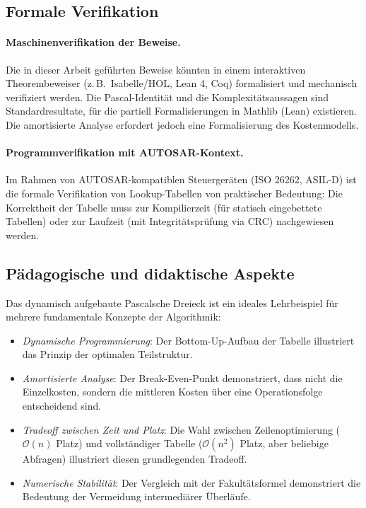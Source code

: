 ﻿\documentclass[12pt, a4paper]{article}
\newcommand{\Oh}{\mathcal{O}}
\theoremstyle{plain}
\theoremstyle{definition}
\theoremstyle{remark}
\renewcommand{\Oh}{\mathcal{O}}
\begin{document}
\subsection{Formale Verifikation}

\paragraph{Maschinenverifikation der Beweise.}
Die in dieser Arbeit geführten Beweise könnten in einem interaktiven
Theorembeweiser (z.\,B.\ Isabelle/HOL, Lean 4, Coq) formalisiert
und mechanisch verifiziert werden. Die Pascal-Identität und die
Komplexitätsaussagen sind Standardresultate, für die partiell
Formalisierungen in Mathlib (Lean) existieren. Die amortisierte
Analyse erfordert jedoch eine Formalisierung des Kostenmodells.

\paragraph{Programmverifikation mit AUTOSAR-Kontext.}
Im Rahmen von AUTOSAR-kompatiblen Steuergeräten \cite{epp2026autosar}
(ISO 26262, ASIL-D) ist die formale Verifikation von Lookup-Tabellen
von praktischer Bedeutung: Die Korrektheit der Tabelle muss zur
Kompilierzeit (für statisch eingebettete Tabellen) oder zur Laufzeit
(mit Integritätsprüfung via CRC) nachgewiesen werden.

\subsection{Pädagogische und didaktische Aspekte}

Das dynamisch aufgebaute Pascalsche Dreieck ist ein ideales
Lehrbeispiel für mehrere fundamentale Konzepte der Algorithmik:
\begin{itemize}
  \item \emph{Dynamische Programmierung}: Der Bottom-Up-Aufbau der
        Tabelle illustriert das Prinzip der optimalen Teilstruktur.
  \item \emph{Amortisierte Analyse}: Der Break-Even-Punkt demonstriert,
        dass nicht die Einzelkosten, sondern die mittleren Kosten
        über eine Operationsfolge entscheidend sind.
  \item \emph{Tradeoff zwischen Zeit und Platz}: Die Wahl zwischen
        Zeilenoptimierung ($\Oh(n)$ Platz) und vollständiger Tabelle
        ($\Oh(n^2)$ Platz, aber beliebige Abfragen) illustriert diesen
        grundlegenden Tradeoff.
  \item \emph{Numerische Stabilität}: Der Vergleich mit der Fakultätsformel
        demonstriert die Bedeutung der Vermeidung intermediärer Überläufe.
\end{itemize}
\end{document}
